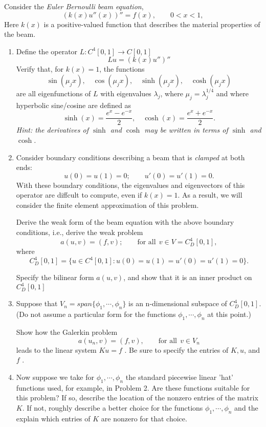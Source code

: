Consider the \textit{Euler Bernoulli beam equation},
\[
(k(x)u''(x))'' = f(x), \qquad 0 < x < 1,
\]
Here $k(x)$ is a positive-valued function that describes the material properties of the beam.  

\begin{enumerate}
\item Define the operator $L:C^4[0,1]\rightarrow C[0,1]$ 
\[
Lu = (k(x)u'')''
\]
Verify that, for $k(x) = 1$, the functions 
\[
\sin(\mu_j x),\quad \cos(\mu_jx), \quad \sinh(\mu_jx),\quad \cosh(\mu_jx)
\]
are all eigenfunctions of $L$ with eigenvalues $\lambda_j$, where $\mu_j = \lambda_j^{1/4}$ and where hyperbolic sine/cosine are defined as
\[
\sinh(x) = \frac{e^x-e^{-x}}{2}, \quad \cosh(x) = \frac{e^x+e^{-x}}{2}.
\]
\emph{Hint: the derivatives of $\sinh$ and $\cosh$ may be written in terms of $\sinh$ and $\cosh$.}

\item Consider boundary conditions describing a beam that is \textit{clamped} at both ends:
\[
u(0) = u(1) = 0; \qquad  u'(0) = u'(1) = 0.
\]
With these boundary conditions, the eigenvalues and eigenvectors of this operator are diffcult to compute, even if $k(x)=1$.  As a result, we will consider the finite element approximation of this problem.  

Derive the weak form of the beam equation with the above boundary conditions, i.e., derive the weak problem
\[
a(u,v) = (f, v); \qquad \mbox{for all} \:\:v \in V = C_D^4[0, 1],
\]
where
\[
C_D^4[0, 1] = \{u \in C^4[0, 1] : u(0) = u(1) = u'(0) = u'(1) = 0\}.
\]

Specify the bilinear form $a(u, v)$, and show that it is an inner product on $C_D^4[0, 1]$

\item Suppose that $V_n = span\{\phi_1, \cdots, \phi_n\}$ is an n-dimensional subspace of $C_D^4[0, 1].$
(Do not assume a particular form for the functions $\phi_1, \cdots, \phi_n$ at this point.)

Show how the Galerkin problem
\[
a(u_n, v) = (f, v), \qquad \mbox{for all}\:\: v \in V_n
\]
leads to the linear system $Ku = f$ . Be sure to specify the entries of $K, u$, and $f$ .

\item Now suppose we take for $\phi_1, \cdots, \phi_n$  the standard piecewise linear 'hat' functions used, for example, in Problem 2. Are these functions suitable for this problem? If so, describe the location of the
nonzero entries of the matrix $K$. If not, roughly describe a better choice for the functions $\phi_1, \cdots, \phi_n$ 
and the explain which entries of $K$ are nonzero for that choice.
\end{enumerate}

